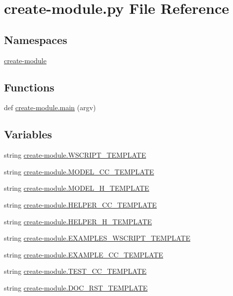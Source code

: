\hypertarget{create-module_8py}{}\section{create-\/module.py File Reference}
\label{create-module_8py}
\subsection*{Namespaces}
\begin{DoxyCompactItemize}
\item 
 \hyperlink{namespacecreate-module}{create-\/module}
\end{DoxyCompactItemize}
\subsection*{Functions}
\begin{DoxyCompactItemize}
\item 
def \hyperlink{namespacecreate-module_a293e91dd0a44f4845da45a092e947974}{create-\/module.\+main} (argv)
\end{DoxyCompactItemize}
\subsection*{Variables}
\begin{DoxyCompactItemize}
\item 
string \hyperlink{namespacecreate-module_aef22727f8a119447d4829afdcccdea22}{create-\/module.\+W\+S\+C\+R\+I\+P\+T\+\_\+\+T\+E\+M\+P\+L\+A\+TE}
\item 
string \hyperlink{namespacecreate-module_a992dfc57cde92a96351e12d640f7be2d}{create-\/module.\+M\+O\+D\+E\+L\+\_\+\+C\+C\+\_\+\+T\+E\+M\+P\+L\+A\+TE}
\item 
string \hyperlink{namespacecreate-module_a99886e8cbcd240dcaeb7ca65566cdbe6}{create-\/module.\+M\+O\+D\+E\+L\+\_\+\+H\+\_\+\+T\+E\+M\+P\+L\+A\+TE}
\item 
string \hyperlink{namespacecreate-module_a4482926e9b75454a934c5dbfce4c7f0e}{create-\/module.\+H\+E\+L\+P\+E\+R\+\_\+\+C\+C\+\_\+\+T\+E\+M\+P\+L\+A\+TE}
\item 
string \hyperlink{namespacecreate-module_a3c745bb622340458336d4c27bd054465}{create-\/module.\+H\+E\+L\+P\+E\+R\+\_\+\+H\+\_\+\+T\+E\+M\+P\+L\+A\+TE}
\item 
string \hyperlink{namespacecreate-module_a4d78d45f600aab71771019e9e66a321f}{create-\/module.\+E\+X\+A\+M\+P\+L\+E\+S\+\_\+\+W\+S\+C\+R\+I\+P\+T\+\_\+\+T\+E\+M\+P\+L\+A\+TE}
\item 
string \hyperlink{namespacecreate-module_a969d5fe5f908bb860dd51f921435e8a9}{create-\/module.\+E\+X\+A\+M\+P\+L\+E\+\_\+\+C\+C\+\_\+\+T\+E\+M\+P\+L\+A\+TE}
\item 
string \hyperlink{namespacecreate-module_a0d5b7c6f3becb0800ddaf6c1e5d7a0e5}{create-\/module.\+T\+E\+S\+T\+\_\+\+C\+C\+\_\+\+T\+E\+M\+P\+L\+A\+TE}
\item 
string \hyperlink{namespacecreate-module_aa462227e0236ab55cb3474b007e28cff}{create-\/module.\+D\+O\+C\+\_\+\+R\+S\+T\+\_\+\+T\+E\+M\+P\+L\+A\+TE}
\end{DoxyCompactItemize}
